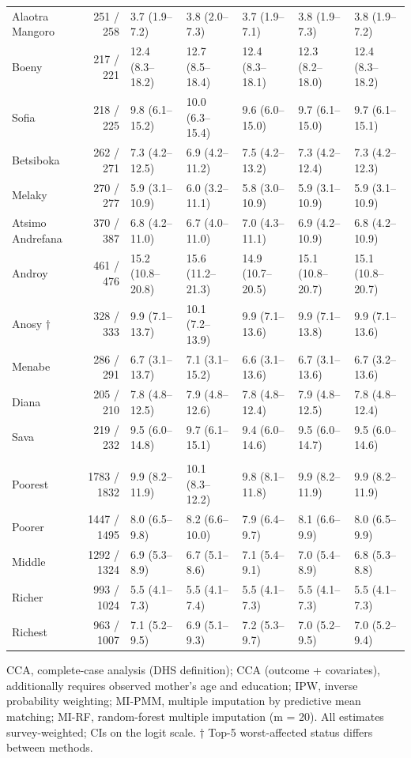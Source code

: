 \begin{longtable}{l|rlllll}
Alaotra Mangoro & 251 / 258 & 3.7 (1.9–7.2) & 3.8 (2.0–7.3) & 3.7 (1.9–7.1) & 3.8 (1.9–7.3) & 3.8 (1.9–7.2) \\ 
Boeny & 217 / 221 & 12.4 (8.3–18.2) & 12.7 (8.5–18.4) & 12.4 (8.3–18.1) & 12.3 (8.2–18.0) & 12.4 (8.3–18.2) \\ 
Sofia & 218 / 225 & 9.8 (6.1–15.2) & 10.0 (6.3–15.4) & 9.6 (6.0–15.0) & 9.7 (6.1–15.0) & 9.7 (6.1–15.1) \\ 
Betsiboka & 262 / 271 & 7.3 (4.2–12.5) & 6.9 (4.2–11.2) & 7.5 (4.2–13.2) & 7.3 (4.2–12.4) & 7.3 (4.2–12.3) \\ 
Melaky & 270 / 277 & 5.9 (3.1–10.9) & 6.0 (3.2–11.1) & 5.8 (3.0–10.9) & 5.9 (3.1–10.9) & 5.9 (3.1–10.9) \\ 
Atsimo Andrefana & 370 / 387 & 6.8 (4.2–11.0) & 6.7 (4.0–11.0) & 7.0 (4.3–11.1) & 6.9 (4.2–10.9) & 6.8 (4.2–10.9) \\ 
Androy & 461 / 476 & 15.2 (10.8–20.8) & 15.6 (11.2–21.3) & 14.9 (10.7–20.5) & 15.1 (10.8–20.7) & 15.1 (10.8–20.7) \\ 
Anosy † & 328 / 333 & 9.9 (7.1–13.7) & 10.1 (7.2–13.9) & 9.9 (7.1–13.6) & 9.9 (7.1–13.8) & 9.9 (7.1–13.6) \\ 
Menabe & 286 / 291 & 6.7 (3.1–13.7) & 7.1 (3.1–15.2) & 6.6 (3.1–13.6) & 6.7 (3.1–13.6) & 6.7 (3.2–13.6) \\ 
Diana & 205 / 210 & 7.8 (4.8–12.5) & 7.9 (4.8–12.6) & 7.8 (4.8–12.4) & 7.9 (4.8–12.5) & 7.8 (4.8–12.4) \\ 
Sava & 219 / 232 & 9.5 (6.0–14.8) & 9.7 (6.1–15.1) & 9.4 (6.0–14.6) & 9.5 (6.0–14.7) & 9.5 (6.0–14.6) \\ 
\midrule\addlinespace[2.5pt]
\multicolumn{7}{l}{Wasting — Wealth quintile} \\[2.5pt] 
\midrule\addlinespace[2.5pt]
Poorest & 1783 / 1832 & 9.9 (8.2–11.9) & 10.1 (8.3–12.2) & 9.8 (8.1–11.8) & 9.9 (8.2–11.9) & 9.9 (8.2–11.9) \\ 
Poorer & 1447 / 1495 & 8.0 (6.5–9.8) & 8.2 (6.6–10.0) & 7.9 (6.4–9.7) & 8.1 (6.6–9.9) & 8.0 (6.5–9.9) \\ 
Middle & 1292 / 1324 & 6.9 (5.3–8.9) & 6.7 (5.1–8.6) & 7.1 (5.4–9.1) & 7.0 (5.4–8.9) & 6.8 (5.3–8.8) \\ 
Richer & 993 / 1024 & 5.5 (4.1–7.3) & 5.5 (4.1–7.4) & 5.5 (4.1–7.3) & 5.5 (4.1–7.3) & 5.5 (4.1–7.3) \\ 
Richest & 963 / 1007 & 7.1 (5.2–9.5) & 6.9 (5.1–9.3) & 7.2 (5.3–9.7) & 7.0 (5.2–9.5) & 7.0 (5.2–9.4) \\ 
\bottomrule
\end{longtable}
\begin{minipage}{\linewidth}
\vspace{.05em}
CCA, complete-case analysis (DHS definition); CCA (outcome + covariates), additionally requires observed mother's age and education; IPW, inverse probability weighting; MI-PMM, multiple imputation by predictive mean matching; MI-RF, random-forest multiple imputation (m = 20). All estimates survey-weighted; CIs on the logit scale. † Top-5 worst-affected status differs between methods.\\
\end{minipage}
\endgroup

